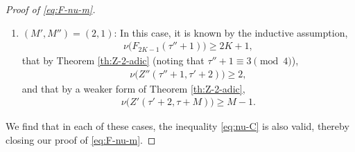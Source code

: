 \documentclass[10pt,a4paper]{amsart}
\begin{document}
\begin{proof}[Proof of \eqref{eq:F-nu-m}]
\begin{enumerate}[label={\textbf{(\alph*).}},leftmargin=*,labelsep=0cm,align=left]
		\item $(M',M'')=(2,1)$: In this case, it is known by the inductive assumption,
		\begin{align*}
			\nu\big(F_{2K-1}(\tau'' + 1)\big) \ge 2K + 1,
		\end{align*}
		that by Theorem \ref{th:Z-2-adic} (noting that $\tau''+1\equiv 3 \pmod{4}$),
		\begin{align*}
			\nu\big(Z''(\tau'' + 1,\tau'+2)\big) \ge 2,
		\end{align*}
		and that by a weaker form of Theorem \ref{th:Z-2-adic},
		\begin{align*}
			\nu\big(Z'(\tau' + 2,\tau+M)\big) \ge M-1.
		\end{align*}
	\end{enumerate}
	We find that in each of these cases, the inequality \eqref{eq:nu-C} is also valid, thereby closing our proof of \eqref{eq:F-nu-m}.
\end{proof}
\end{document}
